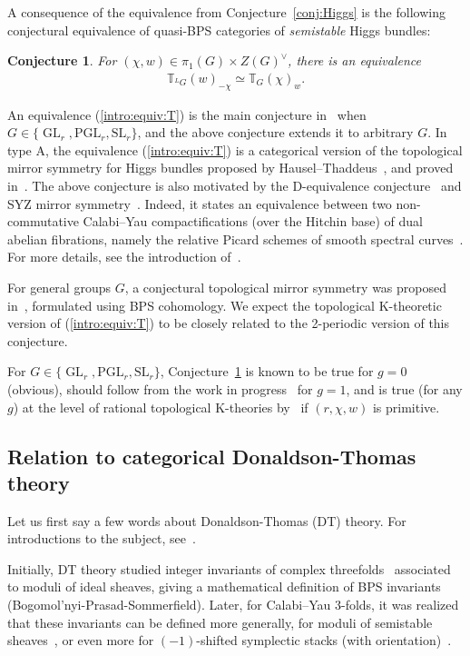 \documentclass [11pt,oneside,a4paper,mathscr]{amsart}
\newtheorem{conj}[thm]{Conjecture}
\theoremstyle{definition}
\newcommand{\GL}{\operatorname{GL}}
\begin{document}
A consequence of the equivalence from Conjecture~\ref{conj:Higgs} is the following conjectural equivalence of quasi-BPS categories of \textit{semistable} Higgs bundles:
\begin{conj}\label{intro:conj:qbps}
For $(\chi, w)\in \pi_1(G)\times Z(G)^{\vee}$, there is an equivalence 
\begin{align}\label{intro:equiv:T}
    \mathbb{T}_{^{L}G}(w)_{-\chi} \simeq \mathbb{T}_{G}(\chi)_{w}.
\end{align}
\end{conj}
An equivalence (\ref{intro:equiv:T}) is the main conjecture in~\cite{PThiggs} when $G \in \{\GL_r, \mathrm{PGL}_r, \mathrm{SL}_r\}$, and the above conjecture extends it 
to arbitrary $G$.
In type A, 
the equivalence (\ref{intro:equiv:T}) is a categorical version of the topological mirror symmetry for
Higgs bundles proposed by Hausel–Thaddeus~\cite{HauTha}, and proved in~\cite{GrWy, MSendscopic}. 
The above conjecture is also motivated by the D-equivalence conjecture~\cite{B-O2, MR1949787} and SYZ mirror symmetry~\cite{SYZ}. 
Indeed, it states an equivalence between two non-commutative Calabi--Yau compactifications (over the Hitchin base) of dual abelian fibrations, namely the relative Picard schemes of smooth spectral curves~\cite[Theorem A]{DoPa}. For more details, see the introduction of~\cite{PThiggs}. 

For general groups $G$, a conjectural topological mirror symmetry was proposed in~\cite[Conjecture~10.3.18]{BDIKP}, formulated using BPS cohomology. We expect the topological K-theoretic version of (\ref{intro:equiv:T}) to be closely related to the 2-periodic version of this conjecture.

For $G\in \{\GL_r, \mathrm{PGL}_r, \mathrm{SL}_r\}$, Conjecture~\ref{intro:conj:qbps} is 
known to be true for $g=0$ (obvious), should follow from the work in progress~\cite{CauPT} for $g=1$, and is
true (for any $g$) at the level of rational topological K-theories by~\cite{PThiggs2} if $(r, \chi, w)$ is primitive.


\subsection{Relation to categorical Donaldson-Thomas theory}\label{subsec:catDT}
Let us first say a few words about Donaldson-Thomas (DT) theory. For introductions to the subject, see~\cite{MR3221298, Sz, TodaSpringer}.

\medskip

Initially, DT theory studied integer invariants of complex threefolds~\cite{Thom} associated to moduli of ideal sheaves, giving a mathematical definition of BPS invariants (Bogomol'nyi-Prasad-Sommerfield). Later, for Calabi--Yau $3$-folds, it was realized that these invariants can be defined more generally, for moduli of semistable sheaves~\cite{K-S, JS}, or even more for $(-1)$-shifted symplectic stacks (with orientation)~\cite{PTVV, BDIKP}. 
\end{document}
